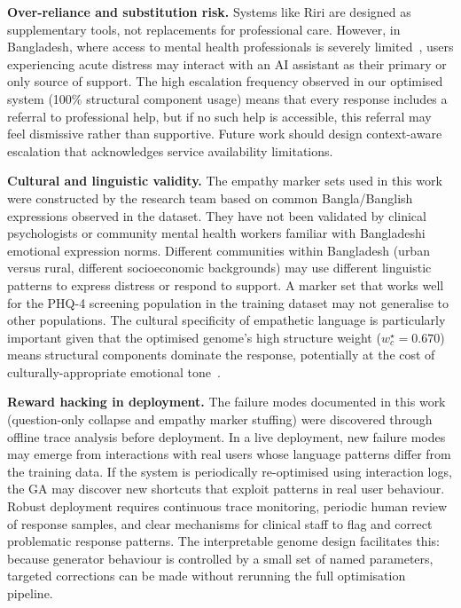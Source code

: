 \documentclass[mathematics,article,xetex,moreauthors]{Definitions/mdpi}
\begin{document}
\textbf{Over-reliance and substitution risk.} Systems like Riri are designed
as supplementary tools, not replacements for professional care. However,
in Bangladesh, where access to mental health professionals is severely
limited~\cite{jmir2025_chatbots}, users experiencing acute distress may
interact with an AI assistant as their primary or only source of support.
The high escalation frequency observed in our optimised system (100\%
structural component usage) means that every response includes a referral
to professional help, but if no such help is accessible, this referral may
feel dismissive rather than supportive. Future work should design
context-aware escalation that acknowledges service availability limitations.

\textbf{Cultural and linguistic validity.} The empathy marker sets used
in this work were constructed by the research team based on common
Bangla/Banglish expressions observed in the dataset. They have not been
validated by clinical psychologists or community mental health workers
familiar with Bangladeshi emotional expression norms. Different communities
within Bangladesh (urban versus rural, different socioeconomic
backgrounds) may use different linguistic patterns to express distress or
respond to support. A marker set that works well for the PHQ-4 screening
population in the training dataset may not generalise to other populations.
The cultural specificity of empathetic language is particularly important
given that the optimised genome's high structure weight ($w_c^{\star} = 0.670$)
means structural components dominate the response, potentially at the cost
of culturally-appropriate emotional tone~\cite{humanai2024}.

\textbf{Reward hacking in deployment.} The failure modes documented in this
work (question-only collapse and empathy marker stuffing) were discovered
through offline trace analysis before deployment. In a live deployment,
new failure modes may emerge from interactions with real users whose
language patterns differ from the training data. If the system is
periodically re-optimised using interaction logs, the GA may discover new
shortcuts that exploit patterns in real user behaviour. Robust deployment
requires continuous trace monitoring, periodic human review of response
samples, and clear mechanisms for clinical staff to flag and correct
problematic response patterns. The interpretable genome design facilitates
this: because generator behaviour is controlled by a small set of named
parameters, targeted corrections can be made without rerunning the full
optimisation pipeline.
\end{document}
